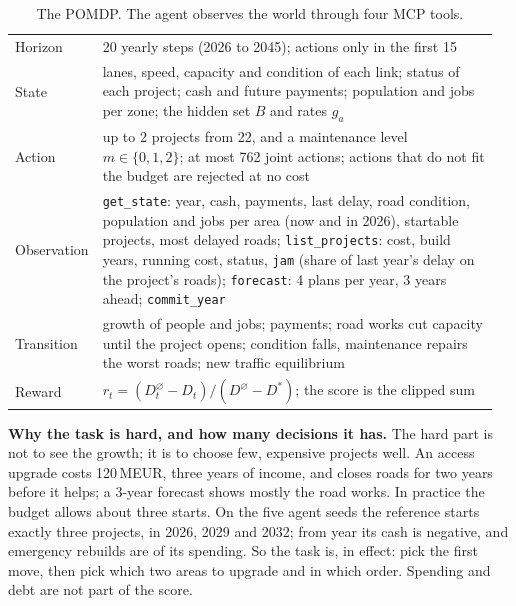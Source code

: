 \documentclass{article}
\begin{document}
\begin{table}[t]
\caption{The POMDP. The agent observes the world through four MCP tools.}
\label{tab:pomdp}
\centering\small
\begin{tabular}{@{}p{0.14\linewidth}p{0.82\linewidth}@{}}
\toprule
Horizon & 20 yearly steps (2026 to 2045); actions only in the first 15 \\
State & lanes, speed, capacity and condition of each link; status of each project; cash and future payments; population and jobs per zone; the hidden set $B$ and rates $g_a$ \\
Action & up to 2 projects from 22, and a maintenance level $m\in\{0,1,2\}$; at most 762 joint actions; actions that do not fit the budget are rejected at no cost \\
Observation & \texttt{get\_state}: year, cash, payments, last delay, road condition, population and jobs per area (now and in 2026), startable projects, most delayed roads; \texttt{list\_projects}: cost, build years, running cost, status, \texttt{jam} (share of last year's delay on the project's roads); \texttt{forecast}: 4 plans per year, 3 years ahead; \texttt{commit\_year} \\
Transition & growth of people and jobs; payments; road works cut capacity until the project opens; condition falls, maintenance repairs the worst roads; new traffic equilibrium \\
Reward & $r_t=(D^{\varnothing}_t-D_t)/(D^{\varnothing}-D^{*})$; the score is the clipped sum \\
\bottomrule
\end{tabular}
\end{table}

\textbf{Why the task is hard, and how many decisions it has.} The hard part is not to see the growth; it is to choose few, expensive projects well. An access upgrade costs 120\,MEUR, three years of income, and closes roads for two years before it helps; a 3-year forecast shows mostly the road works. In practice the budget allows about three starts. On the five agent seeds the reference starts exactly three projects, in 2026, 2029 and 2032; from year \ExploitFirstNegative{} its cash is negative, and emergency rebuilds are \failRebuildShareRef{} of its spending. So the task is, in effect: pick the first move, then pick which two areas to upgrade and in which order. Spending and debt are not part of the score.
\end{document}
